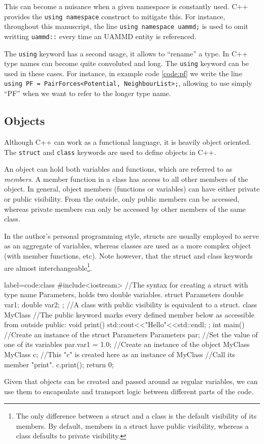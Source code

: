 \documentclass[twoside,openright,titlepage,numbers=noenddot,%
headinclude,footinclude,cleardoublepage=empty,abstract=on,
BCOR=5mm,fontsize=11pt, dvipsnames, paper=b5
]{scrreprt}
\def\ucpp{uammd_cpp_lexer.py:UAMMDCppLexer -x}
\newcommand{\uammd}{\gls{UAMMD}\xspace}
\begin{document}
This can become a nuisance when a given namespace is constantly used. C++ provides the \texttt{using namespace} construct to mitigate this. For instance, throughout this manuscript, the line \texttt{using namespace uammd;} is used to omit writting \texttt{uammd::} every time an \uammd entity is referenced.

The \texttt{using} keyword has a second usage, it allows to ``rename'' a type. In C++ type names can become quite convoluted and long. The \texttt{using} keyword can be used in these cases. For instance, in example code \ref{code:pf} we write the line \texttt{using PF = PairForces<Potential, NeighbourList>;}, allowing to use simply ``PF'' when we want to refer to the longer type name.
\subsection*{Objects}
Although C++ can work as a functional language, it is heavily object oriented. The \texttt{struct} and \texttt{class} keywords are used to define objects in C++.

An object can hold both variables and functions, which are referred to as \emph{members}. A member function in a class has access to all other members of the object. In general, object members (functions or variables) can have either private or public visibility. From the outside, only public members can be accessed, whereas private members can only be accessed by other members of the same class.

In the author's personal programming style, structs are usually employed to serve as an aggregate of variables, whereas classes are used as a more complex object (with member functions, etc). Note however, that the struct and class keywords are almost interchangeable\footnote{The only difference between a struct and a class is the default visibility of its members. By default, members in a struct have public visibility, whereas a class defaults to private visibility.}.

\begin{code2} {label=code:class}
  #include<iostream>
  //The syntax for creating a struct with type name Parameters, holds two double variables.
  struct Parameters{
    double var1;
    double var2;    
  };
  //A class with public visibility is equivalent to a struct.
  class MyClass{
    //The public keyword marks every defined member below as accessible from outside
    public:
    void print(){
      std::cout<<"Hello"<<std::endl;
    }
  };
  int main(){
    //Create an instance of the struct Parameters
    Parameters par;
    //Set the value of one of its variables
    par.var1 = 1.0;
    //Create an instance of the object MyClass
    MyClass c;
    //This "c" is created here as an instance of MyClass
    //Call its member "print".
    c.print();
    return 0;
  }
\end{code2}
Given that objects can be created and passed around as regular variables, we can use them to encapsulate and transport logic between different parts of the code.
\end{document}
